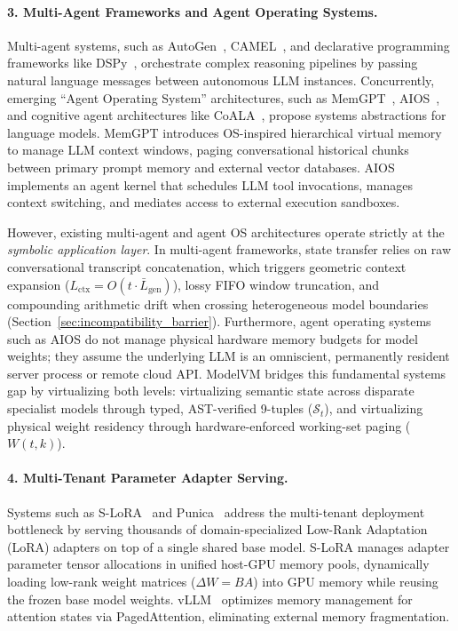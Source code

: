 \paragraph{3. Multi-Agent Frameworks and Agent Operating Systems.}
Multi-agent systems, such as AutoGen~\cite{wu2023autogen}, CAMEL~\cite{li2023camel}, and declarative programming frameworks like DSPy~\cite{khattab2023dspy}, orchestrate complex reasoning pipelines by passing natural language messages between autonomous LLM instances. Concurrently, emerging ``Agent Operating System'' architectures, such as MemGPT~\cite{packer2023memgpt}, AIOS~\cite{mei2024aios}, and cognitive agent architectures like CoALA~\cite{sumers2023coala}, propose systems abstractions for language models. MemGPT introduces OS-inspired hierarchical virtual memory to manage LLM context windows, paging conversational historical chunks between primary prompt memory and external vector databases. AIOS implements an agent kernel that schedules LLM tool invocations, manages context switching, and mediates access to external execution sandboxes.

However, existing multi-agent and agent OS architectures operate strictly at the \textit{symbolic application layer}. In multi-agent frameworks, state transfer relies on raw conversational transcript concatenation, which triggers geometric context expansion ($L_{\text{ctx}} = O(t \cdot \bar{L}_{\text{gen}})$), lossy FIFO window truncation, and compounding arithmetic drift when crossing heterogeneous model boundaries (Section~\ref{sec:incompatibility_barrier}). Furthermore, agent operating systems such as AIOS do not manage physical hardware memory budgets for model weights; they assume the underlying LLM is an omniscient, permanently resident server process or remote cloud API. ModelVM bridges this fundamental systems gap by virtualizing both levels: virtualizing semantic state across disparate specialist models through typed, AST-verified 9-tuples ($\mathcal{S}_t$), and virtualizing physical weight residency through hardware-enforced working-set paging ($W(t, k)$).

\paragraph{4. Multi-Tenant Parameter Adapter Serving.}
Systems such as S-LoRA~\cite{sheng2024slora} and Punica~\cite{chen2023punica} address the multi-tenant deployment bottleneck by serving thousands of domain-specialized Low-Rank Adaptation (LoRA) adapters on top of a single shared base model. S-LoRA manages adapter parameter tensor allocations in unified host-GPU memory pools, dynamically loading low-rank weight matrices ($\Delta W = BA$) into GPU memory while reusing the frozen base model weights. vLLM~\cite{kwon2023vllm} optimizes memory management for attention states via PagedAttention, eliminating external memory fragmentation.


